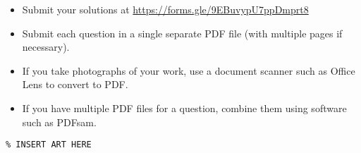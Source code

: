 \documentclass{article}
\begin{document}
\vfill
\small
\begin{itemize}
	\item Submit your solutions at \href{https://forms.gle/9EBuvypU7ppDmprt8}{https://forms.gle/9EBuvypU7ppDmprt8}
	\item Submit each question in a single separate PDF file (with multiple pages if necessary).
	\item If you take photographs of your work, use a document scanner such as Office Lens to convert to PDF.
	\item If you have multiple PDF files for a question, combine them using software such as PDFsam.
\end{itemize}

\vfill
\centering
\small
\begin{BVerbatim}
\end{BVerbatim}
\end{document}
